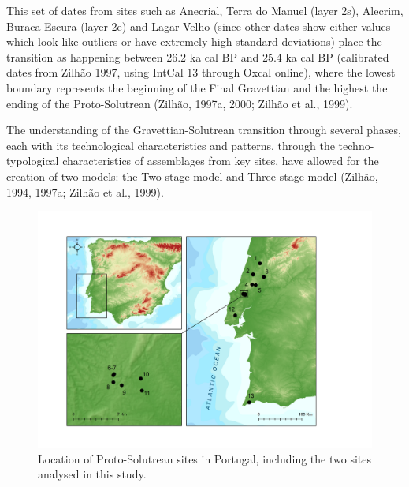 \documentclass[12pt,twoside]{reedthesis}
\begin{document}
This set of dates from sites such as Anecrial, Terra do Manuel (layer 2s), Alecrim, Buraca Escura (layer 2e) and Lagar Velho (since other dates show either values which look like outliers or have extremely high standard deviations) place the transition as happening between 26.2 ka cal BP and 25.4 ka cal BP (calibrated dates from Zilhão 1997, using IntCal 13 through Oxcal online), where the lowest boundary represents the beginning of the Final Gravettian and the highest the ending of the Proto-Solutrean (Zilhão, 1997a, 2000; Zilhão et al., 1999).

The understanding of the Gravettian-Solutrean transition through several phases, each with its technological characteristics and patterns, through the techno-typological characteristics of assemblages from key sites, have allowed for the creation of two models: the Two-stage model and Three-stage model (Zilhão, 1994, 1997a; Zilhão et al., 1999).
\begin{figure}[H]

{\centering \includegraphics[width=0.8\linewidth]{figure/map_proto_solutrean} 

}

\caption{Location of Proto-Solutrean sites in Portugal, including the two sites analysed in this study.}\label{fig:protomap}
\end{figure}
\end{document}
